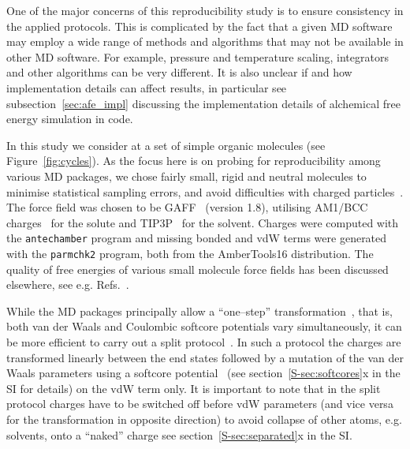 \documentclass[journal=jctcce,manuscript=article]{achemso}
\newcommand{\progname}[1]{\texttt{#1}}
\begin{document}
One of the major concerns of this reproducibility study is to ensure
consistency in the applied protocols.  This is complicated by the fact
that a given MD software may employ a wide range of methods and algorithms that
may not be available in other MD software.  For example, pressure and
temperature scaling, integrators and other algorithms can be very
different.  It is also unclear if and how implementation details can
affect results, in particular see subsection~\ref{sec:afe_impl} discussing the 
implementation details of alchemical free energy simulation in code.

In this study we consider at a set of simple organic molecules (see
Figure~\ref{fig:cycles}).  As the focus here is on probing for
reproducibility among various MD packages, we chose fairly small,
rigid and neutral molecules to minimise statistical sampling errors, and
avoid difficulties with charged
particles~\cite{rocklin_calculating_2013, JCC:JCC1050}.  The force
field was chosen to be GAFF~\cite{wang_development_2004} (version
1.8), utilising AM1/BCC charges~\cite{jakalian_fast_2000,
  jakalian_fast_2002} for the solute and
TIP3P~\cite{jorgensen_comparison_1983-1} for the solvent.  Charges were 
computed with the \progname{antechamber} program and missing bonded and vdW 
terms were generated with the \progname{parmchk2} program, both from the 
AmberTools16 distribution.  The quality of free energies of various small 
molecule force fields has been discussed
elsewhere, see e.g. Refs.~.

While the MD packages principally allow a ``one--step'' 
transformation~\cite{steinbrecher_soft-core_2011},
that is, both van der Waals and Coulombic softcore potentials vary
simultaneously, it can be more efficient to carry out a
split protocol~\cite{naden_linear_2014, naden_linear_2015}. 
In such a protocol the charges are transformed
linearly between the end states followed by a mutation of the van der
Waals parameters using a softcore
potential~\cite{beutler_avoiding_1994,
  zacharias_separationshifted_1994} (see section~\ref{S-sec:softcores}x in the 
  SI for details) on the vdW
term only.  It is important to note that in the split protocol
charges have to be switched off before vdW parameters (and vice versa
for the transformation in opposite direction) to avoid collapse of
other atoms, e.g. solvents, onto a ``naked'' charge \cite{steinbrecher_soft-core_2011} %
see section~\ref{S-sec:separated}x in the SI.
\end{document}
